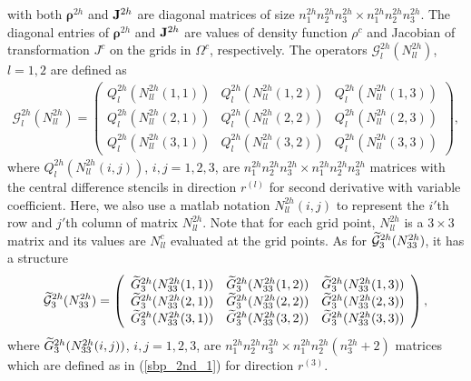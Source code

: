 with both ${\bm \rho}^{2h}$ and ${\bf J}^{2h}$ are diagonal matrices of size  $n_1^{2h}n_2^{2h}n_3^{2h}\times n_1^{2h}n_2^{2h}n_3^{2h}$. The diagonal entries of ${\bm \rho}^{2h}$ and ${\bf J}^{2h}$ are values of density function $\rho^c$ and Jacobian of transformation $J^c$ on the grids in $\Omega^c$, respectively.
The operators $\mathcal{G}_l^{2h}({N}_{ll}^{2h})$, $l=1,2$ are defined as
\begin{align*}\label{g1122}
\mathcal{G}^{2h}_l({N}_{ll}^{2h}) = \left(\begin{array}{ccc}
Q_l^{2h}(N_{ll}^{2h}(1,1)) & Q_l^{2h}(N_{ll}^{2h}(1,2))  & Q_l^{2h}(N_{ll}^{2h}(1,3)) \\
Q_l^{2h}(N_{ll}^{2h}(2,1)) & Q_l^{2h}(N_{ll}^{2h}(2,2))  & Q_l^{2h}(N_{ll}^{2h}(2,3)) \\
Q_l^{2h}(N_{ll}^{2h}(3,1)) & Q_l^{2h}(N_{ll}^{2h}(3,2))  & Q_l^{2h}(N_{ll}^{2h}(3,3)) \end{array}\right),
\end{align*}
where $Q_l^{2h}(N_{ll}^{2h}(i,j))$, $i,j = 1,2,3$, are $n_1^{2h}n_2^{2h}n_3^{2h}\times n_1^{2h}n_2^{2h}n_3^{2h}$ matrices with the central difference stencils in direction $r^{(l)}$ for second derivative with variable coefficient. Here, we also use a matlab notation $N_{ll}^{2h}(i,j)$ to represent the $i'$th row and $j'$th column of matrix $N_{ll}^{2h}$. Note that for each grid point, $N_{ll}^{2h}$ is a $3\times3$ matrix and its values are $N_{ll}^c$ evaluated at the grid points. As for $\widetilde{\mathcal{G}}_3^{2h}({N}_{33}^{2h})$, it has a structure
\[ \widetilde{\mathcal{G}}^{2h}_3({N}_{33}^{2h}) = \left(\begin{array}{ccc}
\widetilde{G}_3^{2h}(N_{33}^{2h}(1,1)) & \widetilde{G}_3^{2h}(N_{33}^{2h}(1,2))  & \widetilde{G}_3^{2h}(N_{33}^{2h}(1,3)) \\
\widetilde{G}_3^{2h}(N_{33}^{2h}(2,1)) & \widetilde{G}_3^{2h}(N_{33}^{2h}(2,2))  & \widetilde{G}_3^{2h}(N_{33}^{2h}(2,3)) \\
\widetilde{G}_3^{2h}(N_{33}^{2h}(3,1)) & \widetilde{G}_3^{2h}(N_{33}^{2h}(3,2))  & \widetilde{G}_3^{2h}(N_{33}^{2h}(3,3)) \end{array}\right),\]
where $\widetilde{G}_3^{2h}(N_{33}^{2h}(i,j))$, $i,j = 1,2,3$, are $n_1^{2h}n_2^{2h}n_3^{2h}\times n_1^{2h}n_2^{2h}(n_3^{2h}+2)$ matrices which are defined as in (\ref{sbp_2nd_1}) for direction $r^{(3)}$. 


